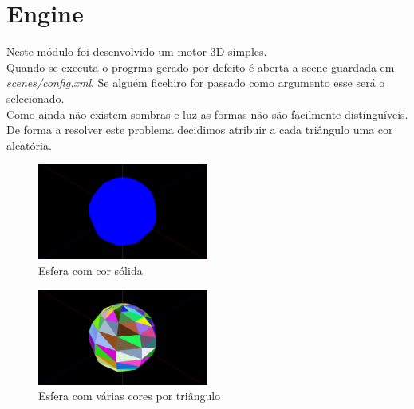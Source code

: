 \documentclass[a4paper]{report}
\begin{document}
\chapter{Engine}
Neste módulo foi desenvolvido um motor 3D simples.\\
Quando se executa o progrma gerado por defeito é aberta a scene guardada em
\textit{scenes/config.xml}. Se alguém ficehiro for passado como argumento esse
será o selecionado.\\
Como ainda não existem sombras e luz as formas não são facilmente
distinguíveis. De forma a resolver este problema decidimos atribuir a cada
triângulo uma cor aleatória.
\begin{figure}[H]
    \centering 
    \includegraphics[width=0.5\textwidth]{images/sphere_onecolor.png}  
    \caption{Esfera com cor sólida}
    \label{fig:sphere_color}
\end{figure}
\begin{figure}[H]
    \centering 
    \includegraphics[width=0.5\textwidth]{images/sphere_color.png}  
    \caption{Esfera com várias cores por triângulo}
    \label{fig:sphere_onecolor}
\end{figure}
\end{document}
